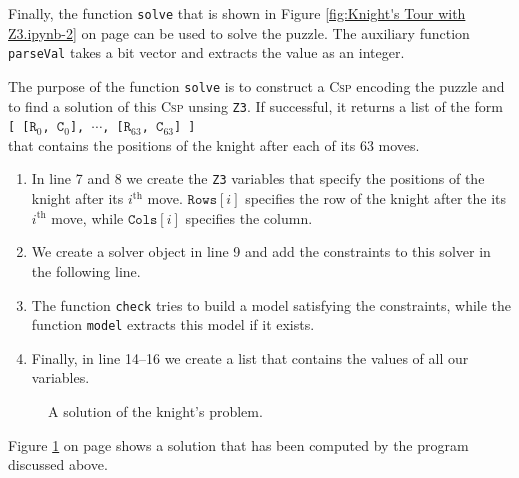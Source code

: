 Finally, the function \texttt{solve} that is shown in Figure \ref{fig:Knight's Tour with Z3.ipynb-2} on page
\pageref{fig:Knight's Tour with Z3.ipynb-2} can be used to solve the puzzle.
The auxiliary function \texttt{parseVal} takes a bit vector and extracts the value as an integer.

The purpose of the function \texttt{solve} is to construct a \textsc{Csp} encoding the puzzle and to find a
solution of this \textsc{Csp} unsing \texttt{Z3}.
If successful, it returns a list of the form
\\[0.2cm]
\hspace*{1.3cm}
\texttt{[ [$\mathtt{R}_0$, $\mathtt{C}_0$], $\cdots$, [$\mathtt{R}_{63}$, $\mathtt{C}_{63}$] ]} 
\\[0.2cm]
that contains the positions of the knight after each of its 63 moves.
\begin{enumerate}
\item In line 7 and 8 we create the \texttt{Z3} variables that specify the positions of the knight after its
      $i^{\mathrm{th}}$ move.  $\texttt{Rows}[i]$ specifies the row of the knight after the its
      $i^{\mathrm{th}}$ move, while $\texttt{Cols}[i]$ specifies the column.
\item We create a solver object in line 9 and add the constraints to this solver in the following line.
\item The function \texttt{check} tries to build a model satisfying the constraints, while the function
      \texttt{model} extracts this model if it exists.
\item Finally, in line 14--16 we create a list that contains the values of all our variables.
\end{enumerate}

\begin{figure}[!ht]
  \centering
  \caption{A solution of the knight's problem.}
  \label{fig:knights-problem.png}
\end{figure}

\noindent
Figure \ref{fig:knights-problem.png} on page \pageref{fig:knights-problem.png} shows a solution that has been
computed by the program discussed above.








